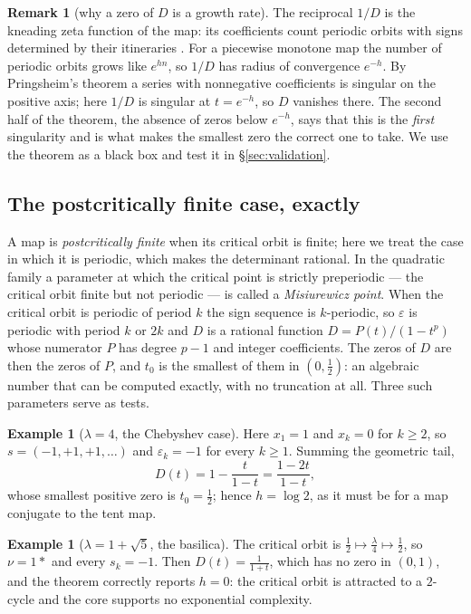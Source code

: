 \documentclass[11pt]{article}
\theoremstyle{plain}
\theoremstyle{definition}
\newtheorem{remark}[theorem]{Remark}
\newtheorem{example}[theorem]{Example}
\newcommand{\eps}{\varepsilon}
\begin{document}
\begin{remark}[why a zero of $D$ is a growth rate]
The reciprocal $1/D$ is the kneading zeta function of the map: its coefficients count
periodic orbits with signs determined by their itineraries \cite{MT}.  For a piecewise
monotone map the number of periodic orbits grows like $e^{hn}$, so $1/D$ has radius of
convergence $e^{-h}$.  By Pringsheim's theorem a series with nonnegative
coefficients is singular on the positive axis; here $1/D$ is singular at $t=e^{-h}$, so $D$
vanishes there.  The second half
of the theorem, the absence of zeros below $e^{-h}$, says that this is the \emph{first}
singularity and is what makes the smallest zero the correct one to take.  We use the
theorem as a black box and test it in \S\ref{sec:validation}.
\end{remark}

\subsection{The postcritically finite case, exactly}\label{sec:pcf}

A map is \emph{postcritically finite} when its critical orbit is finite; here we treat the
case in which it is periodic, which makes the determinant rational.  In the quadratic family
a parameter at which the critical point is strictly preperiodic --- the critical orbit finite
but not periodic --- is called a \emph{Misiurewicz point}.  When the critical orbit
is periodic of period $k$ the sign sequence is $k$-periodic, so
$\eps$ is periodic with period $k$ or $2k$ and $D$ is a rational function
$D=P(t)/(1-t^{p})$ whose numerator $P$ has degree $p-1$ and integer coefficients.  The
zeros of $D$ are then the zeros of $P$, and $t_0$ is the smallest of them in
$(0,\tfrac12)$: an algebraic number that can be computed exactly, with no truncation at
all.  Three such parameters serve as tests.

\begin{example}[$\lambda=4$, the Chebyshev case]\label{ex:lambda4}
Here $x_1=1$ and $x_k=0$ for $k\ge2$, so $s=(-1,+1,+1,\dots)$ and $\eps_k=-1$ for every
$k\ge1$.  Summing the geometric tail,
\[
  D(t)=1-\frac{t}{1-t}=\frac{1-2t}{1-t},
\]
whose smallest positive zero is $t_0=\tfrac12$; hence $h=\log2$, as it must be for a map
conjugate to the tent map.
\end{example}

\begin{example}[$\lambda=1+\sqrt5$, the basilica]\label{ex:basilica}
The critical orbit is $\tfrac12\mapsto\tfrac{\lambda}{4}\mapsto\tfrac12$, so $\nu=1*$ and
every $s_k=-1$.  Then $D(t)=\frac{1}{1+t}$, which has no zero in $(0,1)$, and the theorem
correctly reports $h=0$: the critical orbit is attracted to a $2$-cycle and the core
supports no exponential complexity.
\end{example}
\end{document}
